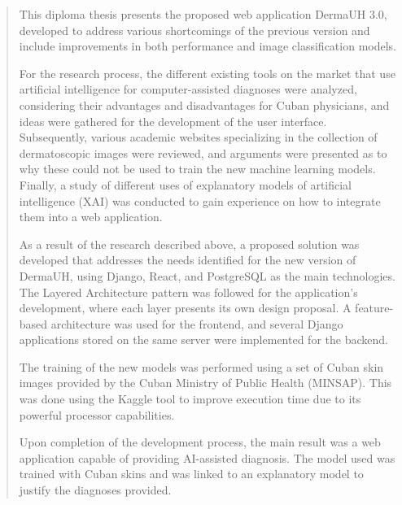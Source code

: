 \begin{abstract}
	This diploma thesis presents the proposed web application DermaUH 3.0, developed to 
	address various shortcomings of the previous version and include improvements in 
	both performance and image classification models.

	For the research process, the different existing tools
	on the market that use artificial intelligence for computer-assisted diagnoses 
	were analyzed, considering their advantages and disadvantages for Cuban physicians, 
	and ideas were gathered for the development of the user interface. Subsequently, 
	various academic websites specializing in the collection of dermatoscopic 
	images were reviewed, and arguments were presented as to why these could not be used 
	to train the new machine learning models. Finally, a study of different uses of
	explanatory models of artificial intelligence (XAI) was conducted to gain experience
	on how to integrate them into a web application.

	As a result of the research described above, a proposed solution was developed 
	that addresses the needs identified for the new version of DermaUH, using Django, 
	React, and PostgreSQL as the main technologies. The Layered Architecture pattern was 
	followed for the application's development, where each layer presents its own design 
	proposal. A feature-based architecture was used for the frontend, and several Django 
	applications stored on the same server were implemented for the backend.

	The training of the new models was performed using a set of Cuban skin images provided
	by the Cuban Ministry of Public Health (MINSAP). This was done using the Kaggle tool 
	to improve execution time due to its powerful processor capabilities.

	Upon completion of the development process, the main result was a web application 
	capable of providing AI-assisted diagnosis. The model used was trained with Cuban 
	skins and was linked to an explanatory model to justify the diagnoses provided.
\end{abstract}